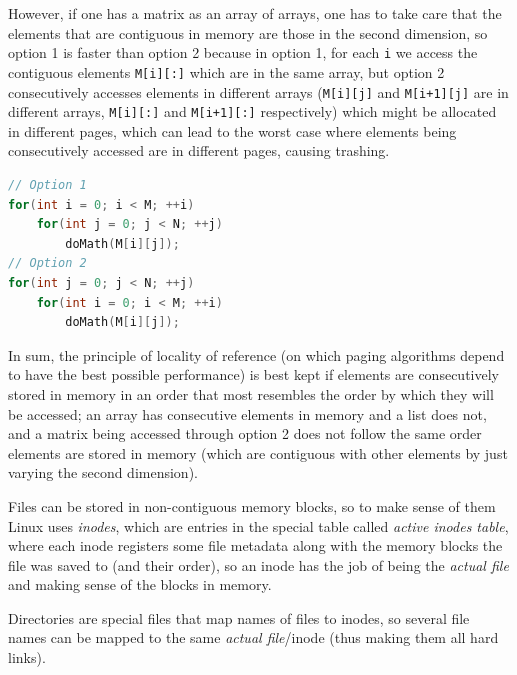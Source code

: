 \documentclass{sope}
\begin{document}
{However, if one has a matrix as an array of arrays, one has to take care that the elements that are contiguous in memory are those in the second dimension, so option 1 is faster than option 2 because in option 1, for each \texttt{i} we access the contiguous elements \texttt{M[i][:]} which are in the same array, but option 2 consecutively accesses elements in different arrays (\texttt{M[i][j]} and \texttt{M[i+1][j]} are in different arrays, \texttt{M[i][:]} and \texttt{M[i+1][:]} respectively) which might be allocated in different pages, which can lead to the worst case where elements being consecutively accessed are in different pages, causing trashing.

\begin{lstlisting}[language=C]
// Option 1
for(int i = 0; i < M; ++i)
    for(int j = 0; j < N; ++j)
        doMath(M[i][j]);
// Option 2
for(int j = 0; j < N; ++j)
    for(int i = 0; i < M; ++i)
        doMath(M[i][j]);
\end{lstlisting}

In sum, the principle of locality of reference (on which paging algorithms depend to have the best possible performance) is best kept if elements are consecutively stored in memory in an order that most resembles the order by which they will be accessed; an array has consecutive elements in memory and a list does not, and a matrix being accessed through option 2 does not follow the same order elements are stored in memory (which are contiguous with other elements by just varying the second dimension).

Files can be stored in non-contiguous memory blocks, so to make sense of them Linux uses \emph{inodes}, which are entries in the special table called \emph{active inodes table}, where each inode registers some file metadata along with the memory blocks the file was saved to (and their order), so an inode has the job of being the \emph{actual file} and making sense of the blocks in memory.

Directories are special files that map names of files to inodes, so several file names can be mapped to the same \emph{actual file}/inode (thus making them all hard links).







}
\end{document}
